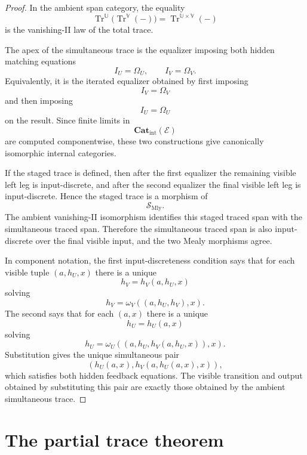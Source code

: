 \begin{proof}
In the ambient span category, the equality
\[
\operatorname{Tr}^{\mathbb U}
\bigl(\operatorname{Tr}^{\mathbb V}(-)\bigr)
=
\operatorname{Tr}^{\mathbb U\times\mathbb V}(-)
\]
is the vanishing-II law of the total trace.

The apex of the simultaneous trace is the equalizer imposing both hidden
matching equations
\[
I_U=\Omega_U,
\qquad
I_V=\Omega_V.
\]
Equivalently, it is the iterated equalizer obtained by first imposing
\[
I_V=\Omega_V
\]
and then imposing
\[
I_U=\Omega_U
\]
on the result.  Since finite limits in
\[
\mathbf{Cat}_{\mathrm{int}}(\mathcal E)
\]
are computed componentwise, these two constructions give canonically
isomorphic internal categories.

If the staged trace is defined, then after the first equalizer the remaining
visible left leg is input-discrete, and after the second equalizer the final
visible left leg is input-discrete.  Hence the staged trace is a morphism of
\[
\mathcal S_{\mathrm{Mly}}.
\]
The ambient vanishing-II isomorphism identifies this staged traced span with
the simultaneous traced span.  Therefore the simultaneous traced span is also
input-discrete over the final visible input, and the two Mealy morphisms agree.

In component notation, the first input-discreteness condition says that for
each visible tuple \((a,h_U,x)\) there is a unique
\[
h_V=h_V(a,h_U,x)
\]
solving
\[
h_V=\omega_V((a,h_U,h_V),x).
\]
The second says that for each \((a,x)\) there is a unique
\[
h_U=h_U(a,x)
\]
solving
\[
h_U=\omega_U((a,h_U,h_V(a,h_U,x)),x).
\]
Substitution gives the unique simultaneous pair
\[
(h_U(a,x),h_V(a,h_U(a,x),x)),
\]
which satisfies both hidden feedback equations.  The visible transition and
output obtained by substituting this pair are exactly those obtained by the
ambient simultaneous trace.
\end{proof}

\section{The partial trace theorem}
\label{sec:partial-trace-theorem}

